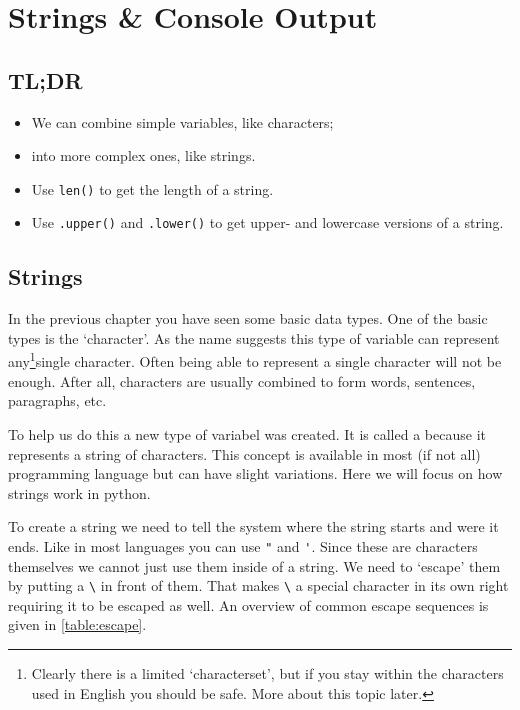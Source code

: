  

\chapter{Strings \& Console Output}

	\section*{TL;DR}
	
	\begin{itemize}
		\item We can combine simple variables, like characters;
		\item into more complex ones, like strings.
		\item Use \lstinline|len()| to get the length of a string.
		\item Use \lstinline|.upper()| and \lstinline|.lower()| to get upper- and lowercase versions of a string.
	\end{itemize}
	\clearpage

	\section{Strings}
	
	In the previous chapter you have seen some basic data types.
	One of the basic types is the `character'.
	As the name suggests this type of variable can represent any\footnote{Clearly there is a limited `characterset', but if you stay within the characters used in English you should be safe. More about this topic later.}single character.
	Often being able to represent a single character will not be enough.
	After all, characters are usually combined to form words, sentences, paragraphs, etc.
	
	To help us do this a new type of variabel was created. 
	It is called a \textbf{} because it represents a string of characters.
	This concept is available in most (if not all) programming language but can have slight variations. 
	Here we will focus on how strings work in python.
	
	To create a string we need to tell the system where the string starts and were it ends. 
	Like in most languages you can use \lstinline|"| and \lstinline|'|.
	Since these are characters themselves we cannot just use them inside of a string.
	We need to `escape' them by putting a \lstinline|\| in front of them.
	That makes \lstinline|\| a special character in its own right requiring it to be escaped as well.
	An overview of common escape sequences is given in \autoref{table:escape}.
	
